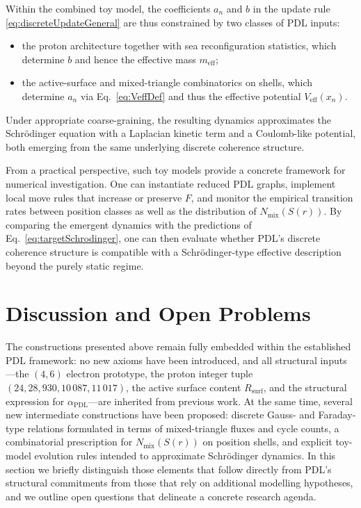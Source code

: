 \documentclass[11pt,a4paper]{article}
\begin{document}
Within the combined toy model, the coefficients $a_{n}$ and $b$ in the update rule \eqref{eq:discreteUpdateGeneral} are thus constrained by two classes of PDL inputs:
\begin{itemize}
  \item the proton architecture together with sea reconfiguration statistics, which determine $b$ and hence the effective mass $m_{\mathrm{eff}}$;
  \item the active-surface and mixed-triangle combinatorics on shells, which determine $a_{n}$ via Eq.~\eqref{eq:VeffDef} and thus the effective potential $V_{\mathrm{eff}}(x_{n})$.
\end{itemize}
Under appropriate coarse-graining, the resulting dynamics approximates the Schr\"odinger equation with a Laplacian kinetic term and a Coulomb-like potential, both emerging from the same underlying discrete coherence structure.

From a practical perspective, such toy models provide a concrete framework for numerical investigation.
One can instantiate reduced PDL graphs, implement local move rules that increase or preserve $F$, and monitor the empirical transition rates between position classes as well as the distribution of $N_{\mathrm{mix}}(S(r))$.
By comparing the emergent dynamics with the predictions of Eq.~\eqref{eq:targetSchrodinger}, one can then evaluate whether PDL’s discrete coherence structure is compatible with a Schr\"odinger-type effective description beyond the purely static regime.\cite{Laubscher2026SchrodingerSketch}

\section{Discussion and Open Problems}

The constructions presented above remain fully embedded within the established PDL framework: no new axioms have been introduced, and all structural inputs—the $(4,6)$ electron prototype, the proton integer tuple $(24,28,930,10\,087,11\,017)$, the active surface content $R_{\mathrm{surf}}$, and the structural expression for $\alpha_{\mathrm{PDL}}$—are inherited from previous work.\cite{Laubscher2026FullPDL,Laubscher2026CombinatorialProton,Laubscher2026Alpha,Laubscher2026SchrodingerPDL}
At the same time, several new intermediate constructions have been proposed: discrete Gauss- and Faraday-type relations formulated in terms of mixed-triangle fluxes and cycle counts, a combinatorial prescription for $N_{\mathrm{mix}}(S(r))$ on position shells, and explicit toy-model evolution rules intended to approximate Schr\"odinger dynamics.
In this section we briefly distinguish those elements that follow directly from PDL’s structural commitments from those that rely on additional modelling hypotheses, and we outline open questions that delineate a concrete research agenda.
\end{document}
